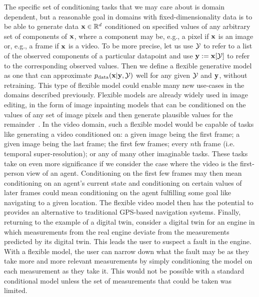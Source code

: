 The specific set of conditioning tasks that we may care about is domain dependent, but a reasonable goal in domains with fixed-dimensionality data is to be able to generate data ${\mathbf{x}} \in \mathbb{R}^d$ conditioned on specified values of any arbitrary set of components of ${\mathbf{x}}$, where a component may be, e.g., a pixel if ${\mathbf{x}}$ is an image or, e.g., a frame if ${\mathbf{x}}$ is a video. To be more precise,
let us use ${\mathcal{Y}}$ to refer to a list of the observed components of a particular datapoint and use ${\mathbf{y}} := {\mathbf{x}}[{\mathcal{Y}}]$ to refer to the corresponding observed values. Then we define a flexible generative model as one that can approximate $p_{\rm{data}}({\mathbf{x}}|{\mathbf{y}},{\mathcal{Y}})$ well for any given ${\mathcal{Y}}$ and ${\mathbf{y}}$, without retraining.
This type of flexible model could enable many new use-cases in the domains described previously. Flexible models are already widely used in image editing, in the form of image inpainting models that can be conditioned on the values of any set of image pixels and then generate plausible values for the remainder~\citep{rombach2022high,zhao2021large,harvey2021conditional}. In the video domain, such a flexible model would be capable of tasks like generating a video conditioned on: a given image being the first frame; a given image being the last frame; the first few frames; every $n$th frame (i.e. temporal super-resolution); or any of many other imaginable tasks. These tasks take on even more significance if we consider the case where the video is the first-person view of an agent. Conditioning on the first few frames may then mean conditioning on an agent's current state and conditioning on certain values of later frames could mean conditioning on the agent fulfilling some goal like navigating to a given location. The flexible video model then has the potential to provides an alternative to traditional GPS-based navigation systems. Finally, returning to the example of a digital twin, consider a digital twin for an engine in which measurements from the real engine deviate from the measurements predicted by its digital twin. This leads the user to suspect a fault in the engine. With a flexible model, the user can narrow down what the fault may be as they take more and more relevant measurements by simply conditioning the model on each measurement as they take it. This would not be possible with a standard conditional model unless the set of measurements that could be taken was limited.

